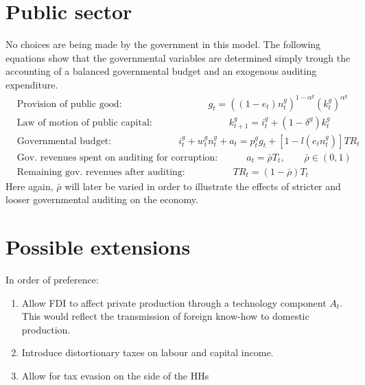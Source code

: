 \documentclass[]{scrartcl}
\begin{document}
\section{Public sector}
No choices are being made by the government in this model. The following equations show that the governmental variables are determined simply trough the accounting of a balanced governmental budget and an exogenous auditing expenditure.
\begin{align}
&\text{Provision of public good:}\qquad\qquad\qquad\qquad\quad g_t=\left( (1-e_t)n_t^g \right)^{1-\alpha^g}\left( k_t^g \right)^{\alpha^g}\\
&\text{Law of motion of public capital:}\qquad\qquad\qquad\qquad  k_{t+1}^g= i^g_t+(1-\delta^g)k_t^g\\
&\text{Governmental budget:}\qquad\qquad\qquad\quad i^g_t+w_t^gn_t^g+a_t= p^g_tg_t+\left[ 1-l\left( e_tn_t^g \right) \right]TR_t\\
&\text{Gov. revenues spent on auditing for corruption:}\quad\qquad  a_t= \bar{\rho}T_t,\qquad \bar{\rho} \in (0,1)\\
&\text{Remaining gov. revenues after auditing:}\qquad\qquad\quad TR_t=(1-\bar{\rho}) T_t
\end{align}
Here again, $ \bar{\rho} $ will later be varied in order to illustrate the effects of stricter and looser governmental auditing on the economy.

\section{Possible extensions}
In order of preference:
\begin{enumerate}
\item Allow FDI to affect private production through a technology component $ A_t $. This would reflect the transmission of foreign know-how to domestic production.
\item Introduce distortionary taxes on labour and capital income.
\item Allow for tax evasion on the side of the HHs
\end{enumerate}
\end{document}
